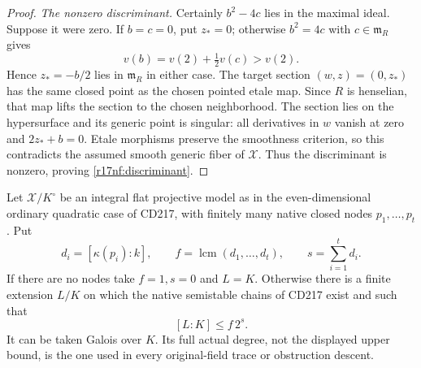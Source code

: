 \begin{proof}
\emph{The nonzero discriminant.}
Certainly $b^2-4c$ lies in the maximal ideal. Suppose
it were zero. If $b=c=0$, put $z_*=0$; otherwise
$b^2=4c$ with $c\in\mathfrak m_R$ gives
\[
                         v(b)=v(2)+\tfrac12v(c)>v(2).
\]
Hence $z_*=-b/2$ lies in $\mathfrak m_R$ in either
case. The target section $(w,z)=(0,z_*)$ has the same
closed point as the chosen pointed etale map. Since
$R$ is henselian, that map lifts the section to the
chosen neighborhood. The section lies on the
hypersurface and its generic point is singular:
all derivatives in $w$ vanish at zero and
$2z_*+b=0$. Etale morphisms preserve the smoothness
criterion, so this contradicts the assumed smooth
generic fiber of $\mathcal X$. Thus the discriminant
is nonzero, proving \eqref{r17nf:discriminant}.
\end{proof}

\begin{corollary}
\label{r17nf:degree}
Let $\mathcal X/K^\circ$ be an integral flat projective
model as in the even-dimensional ordinary quadratic
case of CD217, with finitely many native closed nodes
$p_1,\ldots,p_t$. Put
\[
 d_i=[\kappa(p_i):k],\qquad
 f=\operatorname{lcm}(d_1,\ldots,d_t),\qquad
 s=\sum_{i=1}^t d_i.
\]
If there are no nodes take $f=1,s=0$ and $L=K$.
Otherwise there is a finite extension $L/K$ on which
the native semistable chains of CD217 exist and such
that
\[
                               [L:K]\le f\,2^s.
 \tag{NF217.8}\label{r17nf:bound}
\]
It can be taken Galois over $K$. Its full actual degree,
not the displayed upper bound, is the one used in every
original-field trace or obstruction descent.
\end{corollary}

